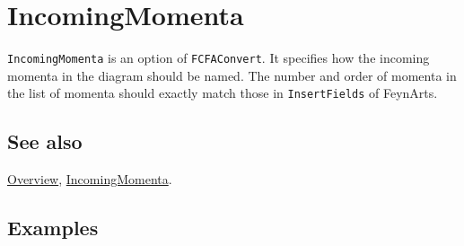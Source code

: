 \documentclass[../FeynCalcManual.tex]{subfiles}
\begin{document}
\hypertarget{incomingmomenta}{
\section{IncomingMomenta}\label{incomingmomenta}}

\texttt{IncomingMomenta} is an option of \texttt{FCFAConvert}. It
specifies how the incoming momenta in the diagram should be named. The
number and order of momenta in the list of momenta should exactly match
those in \texttt{InsertFields} of FeynArts.

\subsection{See also}

\hyperlink{toc}{Overview}, \hyperlink{incomingmomenta}{IncomingMomenta}.

\subsection{Examples}
\end{document}
